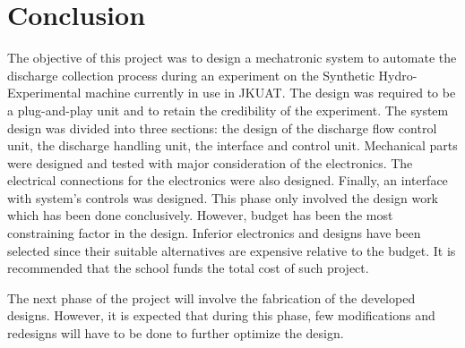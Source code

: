 \section{Conclusion}
\par
The objective of this project was to design a mechatronic system to automate the discharge collection process during an experiment on the Synthetic Hydro-Experimental machine currently in use in JKUAT. The design was required to be a plug-and-play unit and to retain the credibility of the experiment. The system design was divided into three sections: the design of the discharge flow control unit, the discharge handling unit, the interface and control unit. Mechanical parts were designed and tested with major consideration of the electronics. The electrical connections for the electronics were also designed. Finally, an interface with system's controls was designed.  This phase only involved the design work which has been done conclusively. However, budget has been the most constraining factor in the design. Inferior electronics and designs have been selected since their suitable alternatives are expensive relative to the budget. It is recommended that the school funds the total cost of such project.  
\par
The next phase of the project will involve the fabrication of the developed designs. However, it is expected that during this phase, few modifications and redesigns will have to be done to further optimize the design.
